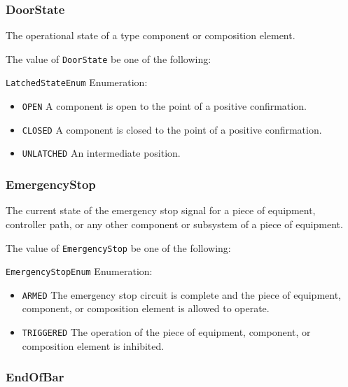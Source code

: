 \subsubsection{DoorState}
\label{sec:DoorState}



The operational state of a  type component or composition element.


The value of \texttt{DoorState} \MUST be one of the following: 


\texttt{LatchedStateEnum} Enumeration:

\begin{itemize}
\item \texttt{OPEN} \newline A component is open to the point of a positive confirmation. 
\item \texttt{CLOSED} \newline A component is closed to the point of a positive confirmation. 
\item \texttt{UNLATCHED} \newline An intermediate position. 
\end{itemize}



\subsubsection{EmergencyStop}
\label{sec:EmergencyStop}



The current state of the emergency stop signal for a piece of equipment, controller path, or any other component or subsystem of a piece of equipment.


The value of \texttt{EmergencyStop} \MUST be one of the following: 


\texttt{EmergencyStopEnum} Enumeration:

\begin{itemize}
\item \texttt{ARMED} \newline The emergency stop circuit is complete and the piece of equipment, component, or composition element is allowed to operate.  
\item \texttt{TRIGGERED} \newline The operation of the piece of equipment, component, or composition element is inhibited. 
\end{itemize}



\subsubsection{EndOfBar}




